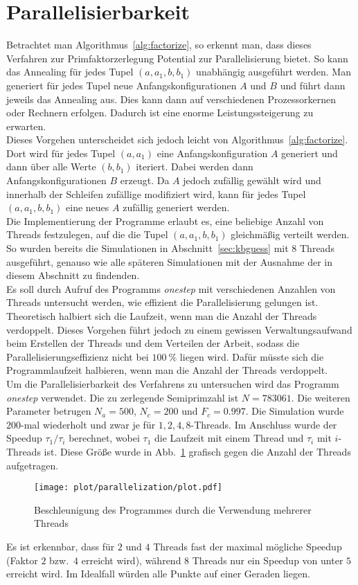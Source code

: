 \section{Parallelisierbarkeit}\label{sec:parallel}
Betrachtet man Algorithmus~\ref{alg:factorize}, so erkennt man, dass dieses Verfahren zur Primfaktorzerlegung Potential zur Parallelisierung bietet. So kann das Annealing für jedes Tupel $\left(a,a_1,b,b_1\right)$ unabhängig ausgeführt werden. Man generiert für jedes Tupel neue Anfangskonfigurationen $A$ und $B$ und führt dann jeweils das Annealing aus. Dies kann dann auf verschiedenen Prozessorkernen oder Rechnern erfolgen. Dadurch ist eine enorme Leistungssteigerung zu erwarten.\\
Dieses Vorgehen unterscheidet sich jedoch leicht von Algorithmus~\ref{alg:factorize}. Dort wird für jedes Tupel $\left(a,a_1\right)$ eine Anfangskonfiguration $A$ generiert und dann über alle Werte $\left(b,b_1\right)$ iteriert. Dabei werden dann Anfangskonfigurationen $B$ erzeugt. Da $A$ jedoch zufällig gewählt wird und innerhalb der Schleifen zufällige modifiziert wird, kann für jedes Tupel $\left(a,a_1,b,b_1\right)$ eine neues $A$ zufällig generiert werden. \\
Die Implementierung der Programme erlaubt es, eine beliebige Anzahl von Threads festzulegen, auf die die Tupel $\left(a,a_1,b,b_1\right)$ gleichmäßig verteilt werden. So wurden bereits die Simulationen in Abschnitt~\ref{sec:kbguess} mit $8$ Threads ausgeführt, genauso wie alle späteren Simulationen mit der Ausnahme der in diesem Abschnitt zu findenden. \\
Es soll durch Aufruf des Programms \textit{onestep} mit verschiedenen Anzahlen von Threads untersucht werden, wie effizient die Parallelisierung gelungen ist. Theoretisch halbiert sich die Laufzeit, wenn man die Anzahl der Threads verdoppelt. Dieses Vorgehen führt jedoch zu einem gewissen Verwaltungsaufwand beim Erstellen der Threads und dem Verteilen der Arbeit, sodass die Parallelisierungseffizienz nicht bei $\SI{100}{\percent}$ liegen wird. Dafür müsste sich die Programmlaufzeit halbieren, wenn man die Anzahl der Threads verdoppelt.\\
Um die Parallelisierbarkeit des Verfahrens zu untersuchen wird das Programm \textit{onestep} verwendet. Die zu zerlegende Semiprimzahl ist $N=783061$. Die weiteren Parameter betrugen $N_a=500$, $N_c=200$ und $F_c=0.997$. Die Simulation wurde $200$-mal wiederholt und zwar je für $1, 2, 4, 8$-Threads. Im Anschluss wurde der Speedup $\tau_1/\tau_i$ berechnet, wobei $\tau_1$ die Laufzeit mit einem Thread und $\tau_i$ mit $i$-Threads ist. Diese Größe wurde in Abb.~\ref{fig:speedup} grafisch gegen die Anzahl der Threads aufgetragen.\\
\begin{figure}[ht]
		\centering
		\texttt{[image: plot/parallelization/plot.pdf]}
		\caption{Beschleunigung des Programmes durch die Verwendung mehrerer Threads}\label{fig:speedup}
\end{figure}
Es ist erkennbar, dass für $2$ und $4$ Threads fast der maximal mögliche Speedup (Faktor $2$ bzw.\ $4$ erreicht wird), während $8$ Threads nur ein Speedup von unter $5$ erreicht wird. Im Idealfall würden alle Punkte auf einer Geraden liegen.

